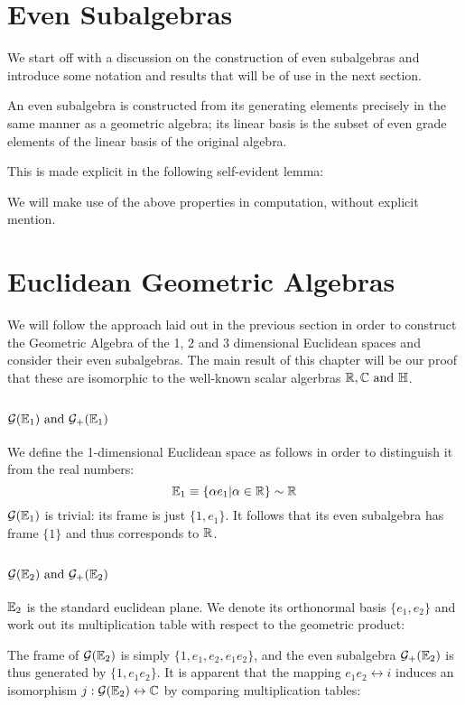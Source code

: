 \section{Even Subalgebras}
We start off with a discussion on the construction of even subalgebras and introduce some notation and results that will be of use in the next section.

An even subalgebra is constructed from its generating elements precisely in the same manner as a geometric algebra; its linear basis is the subset of even grade elements of the linear basis of the original algebra.

This is made explicit in the following self-evident lemma:

We will make use of the above properties in computation, without explicit mention.



\section{Euclidean Geometric Algebras}
We will follow the approach laid out in the previous section in order to construct the Geometric Algebra of the 1, 2 and 3 dimensional Euclidean spaces and consider their even subalgebras.
The main result of this chapter will be our proof that these are isomorphic to the well-known scalar algerbras $\R, \C \mathrm{\ and\ } \HM$.

\subsection{$\G(\E_1)\ \mathrm{and}\ \G_+(\E_1)$}

We define the 1-dimensional Euclidean space as follows in order to distinguish it from the real numbers:
\[\mathbb{E}_1 \equiv \{\alpha e_1 | \alpha \in \mathbb{R}\} \sim \mathbb{R}\]
$\mathcal{G}(\mathbb{E}_1)$  is trivial: its frame is just $\{1, e_1\}$.
It follows that its even subalgebra has frame $\{1\}$ and thus corresponds to $\mathbb{R}$.

\subsection{$\G(\E_2)\ \mathrm{and}\ \G_+(\E_2)$}

$\mathbb{E}_2$ is the standard euclidean plane. We denote its orthonormal basis $\{e_1, e_2\}$ and work out its multiplication table with respect to the geometric product:


The frame of $\mathcal{G}(\mathbb{E}_2)$ is simply $\{1, e_1, e_2, e_1e_2\}$, and the even subalgebra $\mathcal{G}_+(\mathbb{E}_2)$ is thus generated by $\{1, e_1e_2 \}$.
It is apparent that the mapping $e_1e_2 \leftrightarrow i$ induces an isomorphism $j : \mathcal{G}(\mathbb{E}_2) \leftrightarrow \mathbb{C}$ by comparing multiplication tables:


